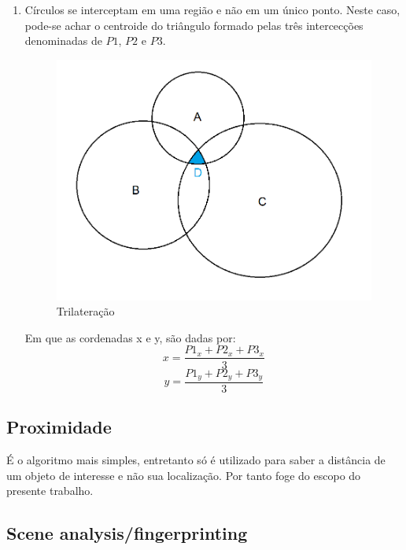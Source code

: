 \begin{enumerate}
	\item Círculos se interceptam em uma região e não em um único ponto. Neste caso, pode-se achar o centroide do triângulo formado pelas três intercecções denominadas de \( P 1\), \( P 2\) e \( P 3\).  
	
	\begin{figure}[H]
		\centering 
		\includegraphics[scale = 0.8]{images/trilateration2.png}
		\caption{Trilateração \cite{art12}}
		\label{fig:trilateration.png}
	\end{figure}

	Em que as cordenadas x e y, são dadas por:
	\begin{equation}
		x = \frac{P1_x + P2_x + P3_x}{3}
	\end{equation}
	\begin{equation}
		y = \frac{P1_y + P2_y + P3_y}{3}
	\end{equation}



\end{enumerate}	




\subsection{Proximidade}
É o algoritmo mais simples, entretanto só é utilizado para saber a distância de um objeto de interesse e não sua localização. Por tanto foge do escopo do presente trabalho.


\subsection{Scene analysis/fingerprinting}

